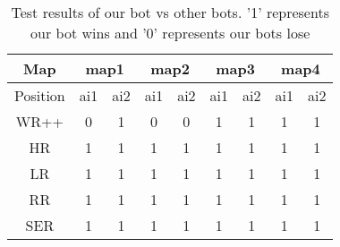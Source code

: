 \begin{table}[h]
    \centering
    \caption{Test results of our bot vs other bots. '1' represents our bot wins and '0' represents our bots lose}
    \label{table:test_result}
    \begin{tabular}{|c|c|c|c|c|c|c|c|c|}
        \toprule
        Map & \multicolumn{2}{|c|}{map1} & \multicolumn{2}{|c|}{map2}
            & \multicolumn{2}{|c|}{map3} & \multicolumn{2}{|c|}{map4} \\
        \midrule
        Position & ai1 & ai2 & ai1 & ai2 & ai1 & ai2 & ai1 & ai2 \\
        \midrule
        WR++     &  0  &  1  &  0  &  0  &  1  &  1  &  1  &  1  \\
        HR       &  1  &  1  &  1  &  1  &  1  &  1  &  1  &  1  \\
        LR       &  1  &  1  &  1  &  1  &  1  &  1  &  1  &  1  \\
        RR       &  1  &  1  &  1  &  1  &  1  &  1  &  1  &  1  \\
        SER      &  1  &  1  &  1  &  1  &  1  &  1  &  1  &  1  \\
        \bottomrule
    \end{tabular}
\end{table}